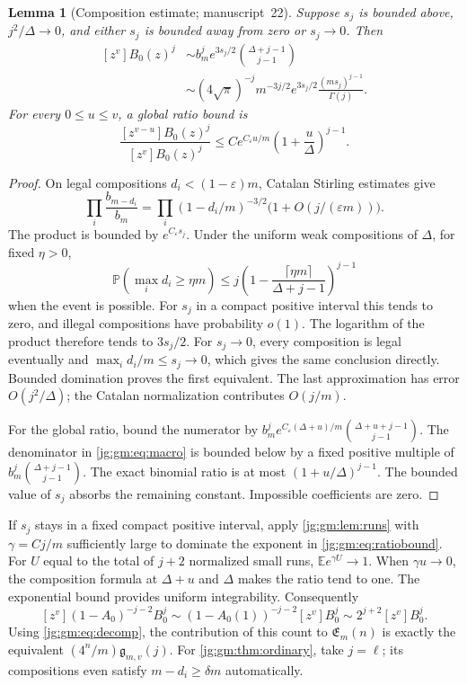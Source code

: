 \documentclass[11pt,a4paper]{article}
\newtheorem{lemma}[lemma]{Lemma}
\theoremstyle{definition}\newaliascnt{definition}{theorem}
\theoremstyle{remark}\newaliascnt{remark}{theorem}
\newcommand{\ljP}{\mathbb P}
\newcommand{\ljE}{\mathbb E}
\begin{document}
\begin{lemma}[Composition estimate; manuscript~22]\label{jg:gm:lem:composition}
Suppose $s_j$ is bounded above, $j^2/\Delta\to0$, and either $s_j$ is bounded
away from zero or $s_j\to0$. Then
\begin{equation}\label{jg:gm:eq:macro}
 \begin{split}
 [z^v]B_0(z)^j
 &\sim b_m^j e^{3s_j/2}\binom{\Delta+j-1}{j-1}\\
 &\sim (4\sqrt\pi)^{-j}m^{-3j/2}
             e^{3s_j/2}\frac{(ms_j)^{j-1}}{\Gamma(j)}.
 \end{split}
\end{equation}
For every $0\le u\le v$, a global ratio bound is
\begin{equation}\label{jg:gm:eq:ratiobound}
 \frac{[z^{v-u}]B_0(z)^j}{[z^v]B_0(z)^j}
 \le C e^{C_\varepsilon u/m}\left(1+\frac u\Delta\right)^{j-1}.
\end{equation}
\end{lemma}
\begin{proof}
On legal compositions $d_i<(1-\varepsilon)m$, Catalan Stirling estimates give
\[
 \prod_i\frac{b_{m-d_i}}{b_m}
  =\prod_i(1-d_i/m)^{-3/2}\bigl(1+O(j/(\varepsilon m))\bigr).
\]
The product is bounded by $e^{C_\varepsilon s_j}$. Under the uniform weak
compositions of $\Delta$, for fixed $\eta>0$,
\[
 \ljP(\max_i d_i\ge\eta m)
 \le j\left(1-\frac{\lceil\eta m\rceil}{\Delta+j-1}\right)^{j-1}
\]
when the event is possible. For $s_j$ in a compact positive interval this tends
to zero, and illegal compositions have probability $o(1)$. The logarithm of the
product therefore tends to $3s_j/2$. For $s_j\to0$, every composition is legal
eventually and $\max_i d_i/m\le s_j\to0$, which gives the same conclusion
directly. Bounded domination proves the first equivalent. The last
approximation has error $O(j^2/\Delta)$; the Catalan normalization contributes
$O(j/m)$.

For the global ratio, bound the numerator by
$b_m^j e^{C_\varepsilon(\Delta+u)/m}\binom{\Delta+u+j-1}{j-1}$. The denominator
in \eqref{jg:gm:eq:macro} is bounded below by a fixed positive multiple of
$b_m^j\binom{\Delta+j-1}{j-1}$. The exact binomial ratio is at most
$(1+u/\Delta)^{j-1}$. The bounded value of $s_j$ absorbs the remaining
constant. Impossible coefficients are zero.
\end{proof}

If $s_j$ stays in a fixed compact positive interval, apply
\cref{jg:gm:lem:runs} with $\gamma=Cj/m$ sufficiently large to dominate the
exponent in \eqref{jg:gm:eq:ratiobound}. For $U$ equal to the total of $j+2$
normalized small runs, $\ljE e^{\gamma U}\to1$. When $\gamma u\to0$, the
composition formula at $\Delta+u$ and $\Delta$ makes the ratio tend to one. The
exponential bound provides uniform integrability. Consequently
\begin{equation}\label{jg:gm:eq:ordinaryruns}
 [z^v](1-A_0)^{-j-2}B_0^j
 \sim(1-A_0(1))^{-j-2}[z^v]B_0^j
 \sim2^{j+2}[z^v]B_0^j.
\end{equation}
Using \eqref{jg:gm:eq:decomp}, the contribution of this count to
$\mathfrak E_m(n)$ is exactly the equivalent $(4^n/m)\mathfrak g_{m,v}(j)$. For
\cref{jg:gm:thm:ordinary}, take $j=\ell$; its compositions even satisfy
$m-d_i\ge\delta m$ automatically.
\end{document}
